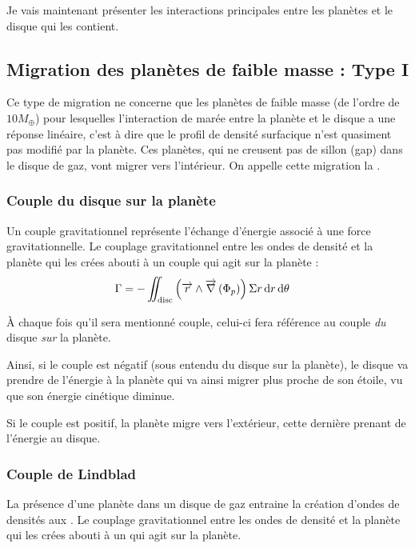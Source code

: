 Je vais maintenant présenter les interactions principales entre les planètes et le disque qui les contient. 

\subsection{Migration des planètes de faible masse : Type I}
Ce type de migration ne concerne que les planètes de faible masse (de l'ordre de $10M_{\oplus}$) pour lesquelles l'interaction de marée entre la planète et le disque a une réponse linéaire, c'est à dire que le profil de densité surfacique n'est quasiment pas modifié par la planète. Ces planètes, qui ne creusent pas de sillon (gap) dans le disque de gaz, vont migrer vers l'intérieur. On appelle cette migration la .


\subsubsection{Couple du disque sur la planète}
Un couple gravitationnel représente l'échange d'énergie associé à une force gravitationnelle.  Le couplage gravitationnel entre les ondes de densité et la planète qui les crées abouti à un couple qui agit sur la planète : 
\begin{align}
\Gamma &= - \iint_\text{disc} \left({\overrightarrow{r}}\wedge{\overrightarrow{\nabla}} \left( \Phi_p\right)\right)\Sigma r \operatorname{d \!} r \operatorname{d \!} \theta
\end{align}

À chaque fois qu'il sera mentionné \og couple\fg, celui-ci fera référence au couple \emph{du} disque \emph{sur} la planète.

Ainsi, si le couple est négatif (sous entendu du disque sur la planète), le disque va prendre de l'énergie à la planète qui va ainsi migrer plus proche de son étoile, vu que son énergie cinétique diminue.

Si le couple est positif, la planète migre vers l'extérieur, cette dernière prenant de l'énergie au disque.

\subsubsection{Couple de Lindblad}
La présence d'une planète dans un disque de gaz entraine la création d'ondes de densités aux  \citep{goldreich1979excitation}. Le couplage gravitationnel entre les ondes de densité et la planète qui les crées abouti à un  qui agit sur la planète.

